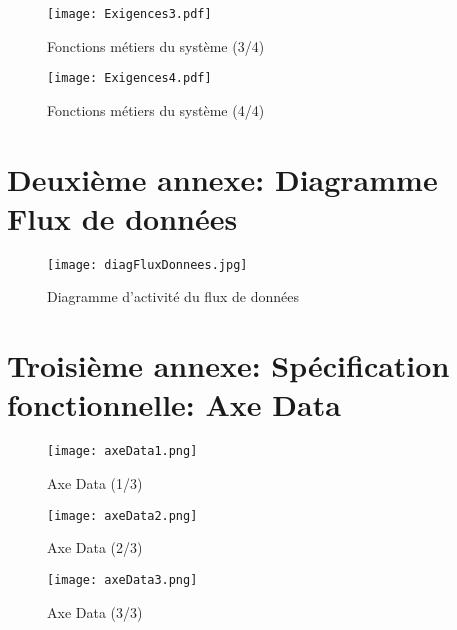 \documentclass[12pt,fleqn]{book} %
\begin{document}
\begin{figure}[h!]
\centering\texttt{[image: Exigences3.pdf]}
\caption{\label{fig:exi3} Fonctions métiers du système (3/4)}
\end{figure}

\begin{figure}[h!]
\centering\texttt{[image: Exigences4.pdf]}
\caption{\label{fig:exi4} Fonctions métiers du système (4/4)}
\end{figure}

\chapter{Deuxième annexe: Diagramme Flux de données}

\begin{figure}[h!]
\centering\texttt{[image: diagFluxDonnees.jpg]}
\caption{\label{fig:donnees} Diagramme d'activité du flux de données}
\end{figure}

\chapter{Troisième annexe: Spécification fonctionnelle: Axe Data}

\begin{figure}[h!]
\centering\texttt{[image: axeData1.png]}
\caption{\label{fig:axeData1} Axe Data (1/3)}
\end{figure}

\begin{figure}[h!]
\centering\texttt{[image: axeData2.png]}
\caption{\label{fig:axeData2} Axe Data (2/3)}
\end{figure}

\begin{figure}[h!]
\centering\texttt{[image: axeData3.png]}
\caption{\label{fig:axeData3} Axe Data (3/3)}
\end{figure}

\backmatter %

%


\nocite{*}
\end{document}
